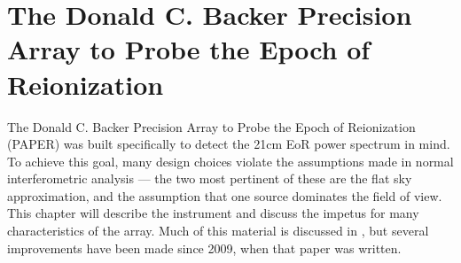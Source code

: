 \chapter{The Donald C. Backer Precision Array to Probe the Epoch of
Reionization}\label{chap:PAPER}

The Donald C. Backer Precision Array to Probe the Epoch of Reionization
(PAPER) was built specifically to detect the 21cm EoR power spectrum in mind. To
achieve this goal, many design choices violate the assumptions made in normal interferometric
analysis --- the two most pertinent of these are the flat sky approximation, and the assumption
that one source dominates the field of view. This chapter will describe the instrument and discuss
the impetus for many characteristics of the array. Much of this material is discussed in
\citet{PGB8}, but several improvements have been made since 2009, when that paper was
written. 



